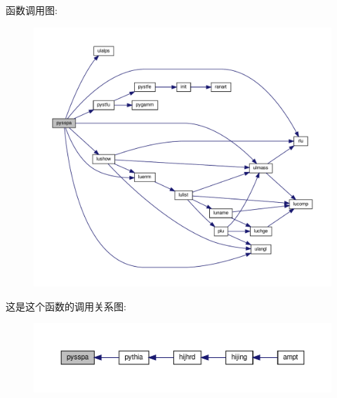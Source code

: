函数调用图\+:
\nopagebreak
\begin{figure}[H]
\begin{center}
\leavevmode
\includegraphics[width=350pt]{pysspa_8f90_acaf3967cc9cce1e72b770b7675891ed5_cgraph}
\end{center}
\end{figure}
这是这个函数的调用关系图\+:
\nopagebreak
\begin{figure}[H]
\begin{center}
\leavevmode
\includegraphics[width=350pt]{pysspa_8f90_acaf3967cc9cce1e72b770b7675891ed5_icgraph}
\end{center}
\end{figure}
